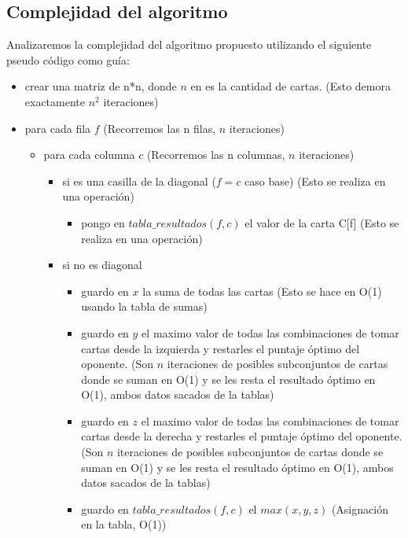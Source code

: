 \newpage 

\subsection{Complejidad del algoritmo}

Analizaremos la complejidad del algoritmo propuesto utilizando el siguiente pseudo c\'odigo como gu\'ia: \\

\begin{itemize}
\item crear una matriz de n*n, donde $n$ en es la cantidad de cartas. (Esto demora exactamente $n^2$ iteraciones)
\item para cada fila $f$ (Recorremos las n filas, $n$ iteraciones)
	\begin{itemize}
	\item para cada columna $c$ (Recorremos las n columnas, $n$ iteraciones)
		\begin{itemize}
			\item si es una casilla de la diagonal ($f = c$ caso base) (Esto se realiza en una operaci\'on)
				\begin{itemize}
				\item pongo en $tabla\_resultados(f,c)$ el valor de la carta C[f] (Esto se realiza en una operaci\'on)
				\end{itemize}
			\item si no es diagonal
				\begin{itemize}
				\item guardo en $x$ la suma de todas las cartas (Esto se hace en O(1) usando la tabla de sumas)
				\item guardo en $y$ el maximo valor de todas las combinaciones de tomar cartas desde la izquierda y restarles el puntaje \'optimo del oponente. (Son $n$ iteraciones de posibles subconjuntos de cartas donde se suman en O(1) y se les resta el resultado \'optimo en O(1), ambos datos sacados de la tablas)
				\item guardo en $z$ el maximo valor de todas las combinaciones de tomar cartas desde la derecha y restarles el puntaje \'optimo del oponente. (Son $n$ iteraciones de posibles subconjuntos de cartas donde se suman en O(1) y se les resta el resultado \'optimo en O(1), ambos datos sacados de la tablas)
				\item guardo en $tabla\_resultados(f,c)$ el $max(x,y,z)$ (Asignaci\'on en la tabla, O(1))
				\end{itemize}
		\end{itemize}
	\end{itemize}
\end{itemize}

